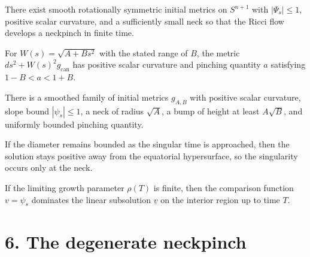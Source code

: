 \begin{proposition}
\label{ch02-prop-neckpinch-happen}
There exist smooth rotationally symmetric initial metrics on \(S^{n+1}\) with
\(|\Psi_s|\le 1\), positive scalar curvature, and a sufficiently small neck so
that the Ricci flow develops a neckpinch in finite time.
\end{proposition}

\begin{lemma}
\label{ch02-lem-neckpinch-bump-model}
For \(W(s)=\sqrt{A+Bs^2}\) with the stated range of \(B\), the metric
\(ds^2+W(s)^2g_{\mathrm{can}}\) has positive scalar curvature and pinching
quantity \(a\) satisfying \(1-B<a<1+B\).
\end{lemma}

\begin{lemma}
\label{ch02-lem-neckpinch-initial-family}
There is a smoothed family of initial metrics \(g_{A,B}\) with positive scalar
curvature, slope bound \(|\psi_s|\le 1\), a neck of radius \(\sqrt A\), a bump
of height at least \(A\sqrt B\), and uniformly bounded pinching quantity.
\end{lemma}

\begin{proposition}
\label{ch02-prop-single-point-pinching}
If the diameter remains bounded as the singular time is approached, then the
solution stays positive away from the equatorial hypersurface, so the
singularity occurs only at the neck.
\end{proposition}

\begin{lemma}
\label{ch02-lem-single-point-subsolution}
If the limiting growth parameter \(\rho(T)\) is finite, then the comparison
function \(v=\psi_s\) dominates the linear subsolution \(\underline v\) on the
interior region up to time \(T\).
\end{lemma}

\section*{6. The degenerate neckpinch}

